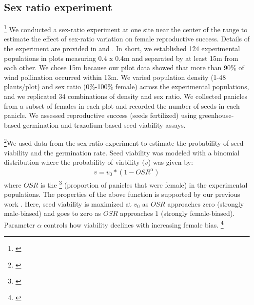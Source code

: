 \documentclass[12pt]{article}\usepackage[]{graphicx}\usepackage[dvipsnames]{xcolor}
\newcommand{\tom}[2]{{\color{red}{#1}}\footnote{\textit{\color{red}{#2}}}}
\begin{document}
\subsection*{Sex ratio experiment}
\tom{}{You say nothing about this experiment in the Results or Discussion, so in its current state this section serves no purpose in this paper.}
We conducted a sex-ratio experiment at one site near the center of the range to estimate the effect of sex-ratio variation on female reproductive success.
Details of the experiment are provided in \cite{compagnoni2017can} and \cite{miller2022two}.
In short, we established 124 experimental populations in plots measuring 0.4 x 0.4m and separated by at least 15m from each other. 
We chose 15m because our pilot data showed that more than 90\% of wind pollination occurred within 13m. 
We varied population density (1-48 plants/plot) and sex ratio (0\%-100\% female) across the experimental populations, and we replicated 34 combinations of density and sex ratio. 
We collected panicles from a subset of females in each plot and recorded the number of seeds in each panicle.
We assessed reproductive success (seeds fertilized) using greenhouse-based germination and trazolium-based seed viability assays. 

\tom{}{I think the data analysis methods could be better organized. Here you describe the experimental methods and data analysis in the same section, but for the common garden experiment you split them.}We used data from the sex-ratio experiment to estimate the probability of seed viability and the germination rate. 
Seed viability was modeled with a binomial distribution where the probability of viability ($v$) was given by:
\begin{align}\label{eq:viab_fn}
v = v_{0} * (1 - OSR^{\alpha})
\end{align}
\noindent where $OSR$ is the \tom{operational sex ratio}{I tried to add a little about this, but generally I think the concept of the operational sex ratio is under-developed throughought the manuscript. It is the main way through which sex-specific climate responses can feed back to influence lambda, so it warrants greater attention.} (proportion of panicles that were female) in the experimental populations.
The properties of the above function is supported by our previous work \citep{compagnoni2017can}. 
Here, seed viability is maximized at $v_{0}$ as $OSR$ approaches zero (strongly male-biased) and goes to zero as $OSR$ approaches $1$ (strongly female-biased).
Parameter $\alpha$ controls how viability declines with increasing female bias.
\tom{}{Throughout the methods I recognize a lot of the text as coming directly from the Am Nat paper. I strongly recommend that you diversify your language and never use published text verbatim. Many journals use plagiarism detection software and this will raise a red flag, even if we are plagiarizing ourselves.}
\end{document}
